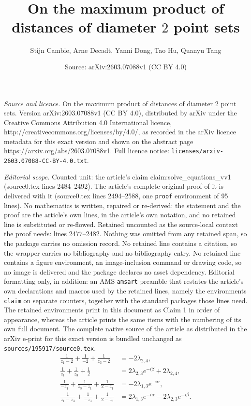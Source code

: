 \documentclass[10pt,a4paper]{amsart}
\title{On the maximum product of distances of diameter $2$ point sets}
\author{Stijn Cambie, Arne Decadt, Yanni Dong, Tao Hu, Quanyu Tang}
\date{Source: arXiv:2603.07088v1 (CC BY 4.0)}
\begin{document}
\maketitle

\noindent\emph{Source and licence.} On the maximum product of distances of diameter $2$ point sets. Version arXiv:2603.07088v1 (CC BY 4.0), distributed by arXiv under the Creative Commons Attribution 4.0 International licence, http://creativecommons.org/licenses/by/4.0/, as recorded in the arXiv licence metadata for this exact version and shown on the abstract page https://arxiv.org/abs/2603.07088v1. Full licence notice: \texttt{licenses/arxiv-2603.07088-CC-BY-4.0.txt}.\par\smallskip

\noindent\textit{Editorial scope.} Counted unit: the article's claim claim:solve\_equations\_vv1 (source0.tex lines 2484--2492). The article's complete original proof of it is delivered with it (source0.tex lines 2494--2588, one \texttt{proof} environment of 95 lines). No mathematics is written, repaired or re-derived: the statement and the proof are the article's own lines, in the article's own notation, and no retained line is substituted or re-flowed.  Retained uncounted as the source-local context the proof needs: lines 2477--2482.  Nothing was omitted from any retained span, so the package carries no omission record.  No retained line contains a citation, so the wrapper carries no bibliography and no bibliography entry.  No retained line contains a figure environment, an image-inclusion command or drawing code, so no image is delivered and the package declares no asset dependency.  Editorial formatting only, in addition: an AMS \texttt{amsart} preamble that restates the article's own declarations and macros used by the retained lines, namely the environments \texttt{claim} on separate counters, together with the standard packages those lines need.  The retained environments print in this document as Claim 1 in order of appearance, whereas the article prints the same items with the numbering of its own full document.  The complete native source of the article as distributed in the arXiv e-print for this exact version is bundled unchanged as \texttt{sources/195917/source0.tex}.
\begin{align}
\frac1{z_1-2}+\frac1{-2}+\frac1{z_3-2} &= -2\lambda_{2,4}, \label{eq:P4-k4}\\
\frac1{z_1}+\frac1{z_3}+\frac1{2} &= 2\lambda_{2,3}e^{-i\beta}+2\lambda_{2,4}, \label{eq:P4-k2}\\
\frac1{-z_1}+\frac1{z_3-z_1}+\frac1{2-z_1} &= -2\lambda_{1,3}e^{-i\alpha}, \label{eq:P4-k1}\\
\frac1{z_1-z_3}+\frac1{-z_3}+\frac1{2-z_3} &= 2\lambda_{1,3}e^{-i\alpha}-2\lambda_{2,3}e^{-i\beta}. \label{eq:P4-k3}
\end{align}
\end{document}

